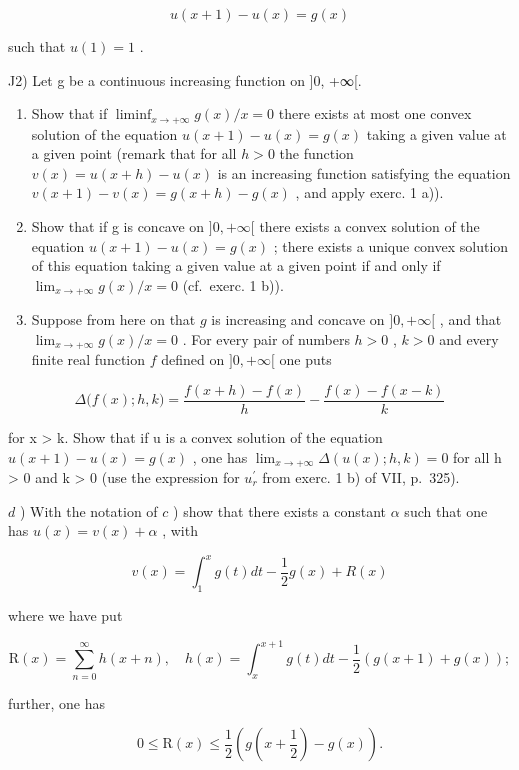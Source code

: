 \[
u (x + 1) - u (x) = g (x)
\]

such that \(u(1)=1\) .

J2) Let g be a continuous increasing function on {]}0, +∞{[}.

\begin{enumerate}
\def\labelenumi{\alph{enumi})}
\item
  Show that if \(\liminf_{x\to +\infty}g(x) / x = 0\) there exists at most one convex solution of the equation \(u(x + 1) - u(x) = g(x)\) taking a given value at a given point (remark that for all \(h > 0\) the function \(v(x) = u(x + h) - u(x)\) is an increasing function satisfying the equation \(v(x + 1) - v(x) = g(x + h) - g(x)\) , and apply exerc. 1 a)).
\item
  Show that if g is concave on \(]0, +\infty[\) there exists a convex solution of the equation \(u(x+1) - u(x) = g(x)\) ; there exists a unique convex solution of this equation taking a given value at a given point if and only if \(\lim_{x \to +\infty} g(x)/x = 0\) (cf.~exerc. 1 b)).
\item
  Suppose from here on that \(g\) is increasing and concave on \(]0, +\infty[\) , and that \(\lim_{x \to +\infty} g(x) / x = 0\) . For every pair of numbers \(h > 0\) , \(k > 0\) and every finite real function \(f\) defined on \(]0, +\infty[\) one puts
\end{enumerate}

\[
\varDelta \Big (f (x); h, k \Big) = \frac {f (x + h) - f (x)}{h} - \frac {f (x) - f (x - k)}{k}
\]

for x \textgreater{} k. Show that if u is a convex solution of the equation \(u(x + 1) - u(x) = g(x)\) , one has \(\lim_{x \to +\infty} \Delta(u(x); h, k) = 0\) for all h \textgreater{} 0 and k \textgreater{} 0 (use the expression for \(u_{r}^{\prime}\) from exerc. 1 b) of VII, p.~325).

\(d\) ) With the notation of \(c\) ) show that there exists a constant \(\alpha\) such that one has \(u(x) = v(x) + \alpha\) , with

\[
v (x) = \int_ {1} ^ {x} g (t) d t - \frac {1}{2} g (x) + R (x)
\]

where we have put

\[
\mathrm{R} (x) = \sum_ {n = 0} ^ {\infty} h (x + n), \quad h (x) = \int_ {x} ^ {x + 1} g (t) d t - \frac {1}{2} (g (x + 1) + g (x));
\]

further, one has

\[
0 \leqslant \mathrm{R} (x) \leqslant \frac {1}{2} (g (x + \frac {1}{2}) - g (x)).
\]

